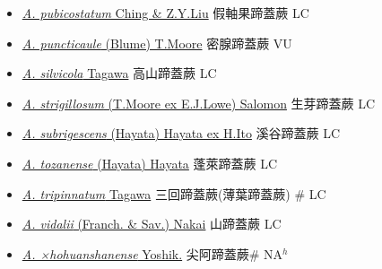 \begin{itemize}
\begin{itemize}
        \item[] \href{http://www.theplantlist.org/tpl1.1/search?q=Athyrium+pubicostatum}{\textit{A. pubicostatum} Ching \& Z.Y.Liu}   假軸果蹄蓋蕨 LC
        \item[] \href{http://www.theplantlist.org/tpl1.1/search?q=Athyrium+puncticaule}{\textit{A. puncticaule} (Blume) T.Moore}   密腺蹄蓋蕨 VU
        \item[] \href{http://www.theplantlist.org/tpl1.1/search?q=Athyrium+silvicola}{\textit{A. silvicola} Tagawa}   高山蹄蓋蕨 LC
        \item[] \href{http://www.theplantlist.org/tpl1.1/search?q=Athyrium+strigillosum}{\textit{A. strigillosum} (T.Moore ex E.J.Lowe) Salomon}   生芽蹄蓋蕨 LC
        \item[] \href{http://www.theplantlist.org/tpl1.1/search?q=Athyrium+subrigescens}{\textit{A. subrigescens} (Hayata) Hayata ex H.Ito}   溪谷蹄蓋蕨 LC
        \item[] \href{http://www.theplantlist.org/tpl1.1/search?q=Athyrium+tozanense}{\textit{A. tozanense} (Hayata) Hayata}     蓬萊蹄蓋蕨 LC
        \item[] \href{http://www.theplantlist.org/tpl1.1/search?q=Athyrium+tripinnatum}{\textit{A. tripinnatum} Tagawa}     三回蹄蓋蕨(薄葉蹄蓋蕨)  \# LC
        \item[] \href{http://www.theplantlist.org/tpl1.1/search?q=Athyrium+vidalii}{\textit{A. vidalii} (Franch. \& Sav.) Nakai}   山蹄蓋蕨 LC
        \item[] \href{http://www.theplantlist.org/tpl1.1/search?q=Athyrium+×hohuanshanense}{\textit{A. ×hohuanshanense} Yoshik.}   尖阿蹄蓋蕨\# NA$^h$

\end{itemize}
\end{itemize}
